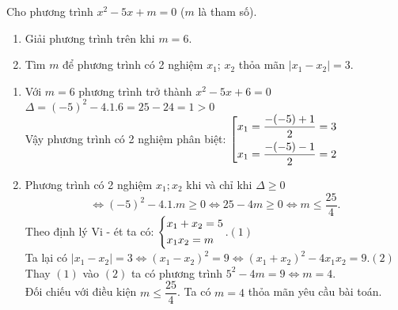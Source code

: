 \begin{ex}%
Cho phương trình $x^2 - 5x + m = 0 $ ($m$ là tham số).
\begin{enumerate}
\item Giải phương trình trên khi $m = 6$.
\item Tìm $m$ để phương trình có 2 nghiệm $x_1$; $x_2$ thỏa mãn $|x_1 - x_2| = 3$.
\end{enumerate}
\loigiai
    {
\begin{enumerate}
\item Với $m = 6$ phương trình trở thành $x^2 - 5x + 6= 0$\\
$\Delta = (-5)^2 - 4.1.6 = 25 - 24 = 1 > 0$\\
Vậy phương trình có 2 nghiệm phân biệt:
$\left[\begin{aligned}&x_1 = \dfrac{-(-5) + 1}{2}= 3\\ &x_1 = \dfrac{-(-5) - 1}{2}= 2 \end{aligned}\right.$
\item Phương trình có 2 nghiệm $x_1; x_2$ khi và chỉ khi $\Delta \ge 0$
$$\Leftrightarrow (-5)^2 - 4.1.m \ge 0\Leftrightarrow 25 - 4m \ge 0\Leftrightarrow m \le \dfrac{25}{4}.$$
Theo định lý Vi - ét ta có: $\left\{\begin{aligned}&x_1 + x_2 = 5 \\ & x_1x_2 = m\end{aligned}\right.$.\hfill $(1)$\\
Ta lại có $|x_1 - x_2| = 3 \Leftrightarrow (x_1 - x_2)^2 = 9 \Leftrightarrow (x_1 +x_2)^2 - 4x_1x_2 = 9$.\hfill $(2)$\\
Thay $(1)$ vào $(2)$ ta có phương trình $5^2 - 4m = 9 \Leftrightarrow m = 4$.\\
Đối chiếu với điều kiện $m \le \dfrac{25}{4}$. Ta có $m = 4$ thỏa mãn yêu cầu bài toán.
\end{enumerate} 
    }
\end{ex}


